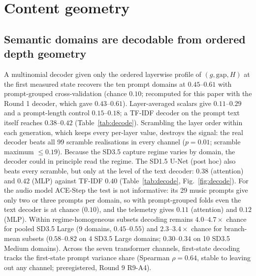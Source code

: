 \documentclass[11pt]{article}
\newcommand{\gap}{\mathrm{gap}}
\begin{document}
\section{Content geometry}\label{sec:content}

\subsection{Semantic domains are decodable from ordered depth geometry}
A multinomial decoder given only the ordered layerwise profile of $(g,\gap,H)$ at the first measured state recovers the ten prompt domains at $0.45$--$0.61$ with prompt-grouped cross-validation (chance $0.10$; recomputed for this paper with the Round 1 decoder, which gave $0.43$--$0.61$). Layer-averaged scalars give $0.11$--$0.29$ and a prompt-length control $0.15$--$0.18$; a TF-IDF decoder on the prompt text itself reaches $0.38$--$0.42$ (Table~\ref{tab:decode}). Scrambling the layer order within each generation, which keeps every per-layer value, destroys the signal: the real decoder beats all 99 scramble realisations in every channel ($p=0.01$; scramble maximum $\le0.19$). Because the SD3.5 capture regime varies by domain, the decoder could in principle read the regime. The SD1.5 U-Net (post hoc) also beats every scramble, but only at the level of the text decoder: $0.38$ (attention) and $0.42$ (MLP) against TF-IDF $0.40$ (Table~\ref{tab:decode}, Fig.~\ref{fig:decode}). For the audio model ACE-Step the test is not informative: its 29 music prompts give only two or three prompts per domain, so with prompt-grouped folds even the text decoder is at chance ($0.10$), and the telemetry gives $0.11$ (attention) and $0.12$ (MLP). Within regime-homogeneous subsets decoding remains $4.0$--$4.7\times$ chance for pooled SD3.5 Large (9 domains, $0.45$--$0.55$) and $2.3$--$3.4\times$ chance for branch-mean subsets ($0.58$--$0.82$ on 4 SD3.5 Large domains; $0.30$--$0.34$ on 10 SD3.5 Medium domains). Across the seven transformer channels, first-state decoding tracks the first-state prompt variance share (Spearman $\rho=0.64$, stable to leaving out any channel; preregistered, Round 9 R9-A4).
\end{document}
